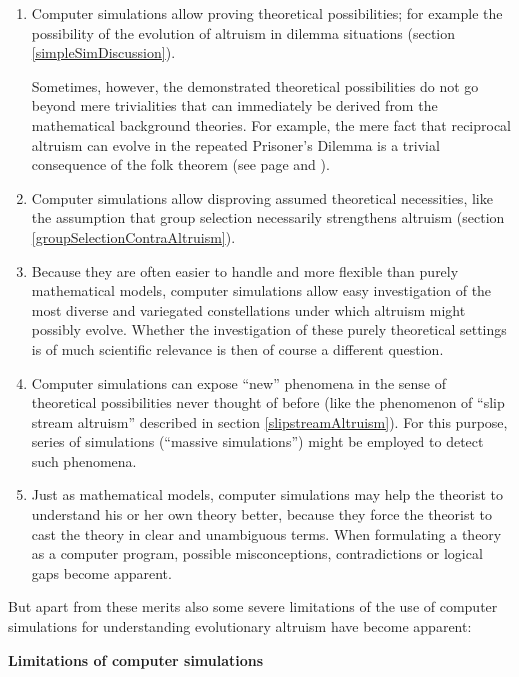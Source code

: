 \begin{enumerate}
\item Computer simulations allow proving theoretical possibilities; for
  example the possibility of the evolution of altruism in dilemma situations
  (section \ref{simpleSimDiscussion}).

  Sometimes, however, the demonstrated theoretical possibilities do not go
  beyond mere trivialities that can immediately be derived from the
  mathematical background theories. For example, the mere fact that reciprocal
  altruism can evolve in the repeated Prisoner's Dilemma is a trivial
  consequence of the folk theorem (see page \pageref{folkTheorem} and
  \pageref{simpleSimDiscussion}).

\item Computer simulations allow disproving assumed theoretical necessities,
  like the assumption that group selection necessarily strengthens altruism
  (section \ref{groupSelectionContraAltruism}).

\item Because they are often easier to handle and more flexible than purely
  mathematical models, computer simulations allow easy investigation of the
  most diverse and variegated constellations under which altruism might
  possibly evolve. Whether the investigation of these purely theoretical
  settings is of much scientific relevance is then of course a different
  question.

\item Computer simulations can expose ``new'' phenomena in the sense of
  theoretical possibilities never thought of before (like the phenomenon
of ``slip stream altruism'' described in section
  \ref{slipstreamAltruism}). For this purpose, series of simulations
  (``massive simulations'') might be employed to detect such phenomena.

\item Just as mathematical models, computer simulations may help the theorist
  to understand his or her own theory better, because they force the theorist
  to cast the theory in clear and unambiguous terms. When formulating a theory
  as a computer program, possible misconceptions, contradictions or logical
  gaps become apparent.
\end{enumerate}

But apart from these merits also some severe limitations of
the use of computer simulations for understanding evolutionary altruism have
become apparent:

\begin{center}{\bf Limitations of computer simulations}\end{center}

